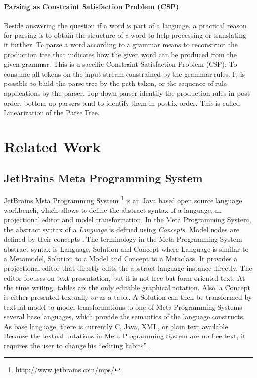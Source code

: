 \paragraph{Parsing as Constraint Satisfaction Problem (CSP)} 
Beside answering the question if a word is part of a language, a practical reason for parsing is to obtain the structure of a word to help processing or translating it further. To parse a word according to a grammar means to reconstruct the production tree that indicates how the given word can be produced from the given grammar. This is a specific Constraint Satisfaction Problem (CSP): To consume all tokens on the input stream constrained by the grammar rules. It is possible to build the parse tree by the path taken, or the sequence of rule applications by the parser.  Top-down parser identify the production rules in post-order, bottom-up parsers tend to identify them in postfix order. This is called Linearization of the Parse Tree. \cite{ParserBook}



\section{Related Work} 


\subsection{JetBrains Meta Programming System}
JetBrains Meta Programming System \footnote{\raggedright \url{http://www.jetbrains.com/mps/}}  is an Java based open source language workbench, which allows to define the abstract syntax of a language, an projectional editor and model transformation. In the Meta Programming System, the abstract syntax of a \emph{Language} is defined using \emph{Concepts}. Model nodes are defined by their concepts \cite{MPStut}. The terminology in the Meta Programming System abstract syntax is Language, Solution and Concept where Language is similar to a Metamodel, Solution to a Model and Concept to a Metaclass. It provides a projectional editor that directly edits the abstract language instance directly. The editor focuses on text presentation, but it is not free but form oriented text. At the time writing, tables are the only editable graphical notation. Also, a Concept is either presented textually \emph{or} as a table. A Solution can then be transformed by textual model to model transformations to one of  Meta Programming Systems several base languages, which provide the semantics of the language constructs. As base language, there is currently C, Java, XML, or plain text available. Because the textual notations in Meta Programming System are no free text, it requires the user to change his ``editing habits'' \cite{VolterMPS}. 

